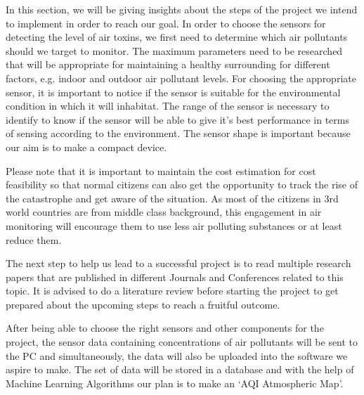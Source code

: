 In this section, we will be giving insights about the steps of the project we intend to implement in order to reach our goal. In order to choose the sensors for detecting the level of air toxins, we first need to determine which air pollutants should we target to monitor. The maximum parameters need to be researched that will be appropriate for maintaining a healthy surrounding for different factors, e.g. indoor and outdoor air pollutant levels. For choosing the appropriate sensor, it is important to notice if the sensor is suitable for the environmental condition in which it will inhabitat. The range of the sensor is necessary to identify to know if the sensor will be able to give it’s best performance in terms of sensing according to the environment. The sensor shape is important because our aim is to make a compact device. 

Please note that it is important to maintain the cost estimation for cost feasibility so that normal citizens can also get the opportunity to track the rise of the catastrophe and get aware of the situation. As most of the citizens in 3rd world countries are from middle class background, this engagement in air monitoring will encourage them to use less air polluting substances or at least reduce them.

The next step to help us lead to a successful project is to read multiple research papers that are published in different Journals and Conferences related to this topic. It is advised to do a literature review before starting the project to get prepared about the upcoming steps to reach a fruitful outcome. 

After being able to choose the right sensors and other components for the project, the sensor data containing concentrations of air pollutants will be sent to the PC and simultaneously, the data will also be uploaded into the software we aspire to make. The set of data will be stored in a database and with the help of Machine Learning Algorithms our plan is to make an ‘AQI Atmospheric Map’. 


\vspace{0.5cm}
